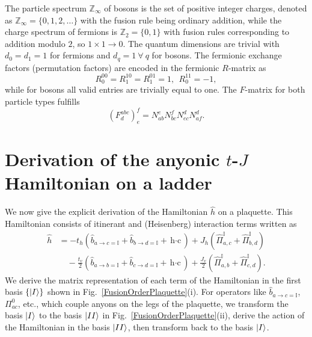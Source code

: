 \documentclass[aps,reprint,superscriptaddress,amsmath,amssymb,amsfonts,prb]{revtex4-1}
\newcommand{\mbb}[1]{\mathbb{#1}}
\begin{document}
The particle spectrum $\mathbb{Z}_{\infty}$ of bosons is the set of positive integer charges, denoted as $\mathbb{Z}_{\infty} = \{0, 1, 2, \ldots  \}$ with the fusion rule being ordinary addition, while the charge spectrum of fermions is $\mathbb{Z}_{2}= \{0,1 \}$ with fusion rules corresponding to addition modulo $2$, so $1 \times 1 \rightarrow 0$. 
The quantum dimensions are trivial with $d_0=d_1 = 1$ for fermions and $d_q=1~\forall~q$ for bosons. %
The fermionic exchange factors (permutation factors) are encoded in the %
fermionic $R$-matrix as
\begin{equation}
R^{00}_0 = R^{10}_1 = R^{01}_1 = 1, ~~ R^{11}_0 = -1,
\end{equation}
while for bosons all valid entries are trivially equal to one. 
The $F$-matrix for both particle types fulfills
\begin{equation}
\left( F^{abc}_d \right)_e^f = N_{ab}^e N_{bc}^f N_{ec}^d N_{af}^d .
\end{equation}

\section{Derivation of the anyonic $t$-$J$ Hamiltonian on a ladder}
We now give the explicit derivation of the Hamiltonian $\hat{h}$ on a plaquette. This Hamiltonian consists of itinerant and (Heisenberg) interaction terms written as
\begin{align}
 \hat{h} &= -t_h \left( \hat{b}_{a \rightarrow c=\mbb{I}}  + \hat{b}_{b \rightarrow d=\mbb{I}} + \text{h$\cdot$c} \right)  + J_h \left( \hat{\Pi}^{\mathbb{I}}_{a,c} + \hat{\Pi}^{\mathbb{I}}_{b,d} \right) \nonumber \\
& \quad - \frac{t_v}{2} \left( \hat{b}_{a \rightarrow b=\mbb{I}} + \hat{b}_{c \rightarrow d=\mbb{I}} + \text{h$\cdot$c} \right) + \frac{J_v}{2} \left( \hat{\Pi}^{\mathbb{I}}_{a,b} + \hat{\Pi}^{\mathbb{I}}_{c,d} \right) .
\end{align}
We derive the matrix representation of each term of the Hamiltonian in the first basis $\{\ket{I} \}$ shown in Fig.~\ref{FusionOrderPlaquette}(i). For operators like $\hat{b}_{a \rightarrow c=\mbb{I}}$, $\Pi_{ac}^0$, etc., which couple anyons on the legs of the plaquette, we transform the basis $\ket{I}$ to the basis $\ket{II}$ in Fig.~\ref{FusionOrderPlaquette}(ii), derive the action of the Hamiltonian in the basis $\ket{II}$, then transform back to the basis $\ket{I}$. 
\end{document}
